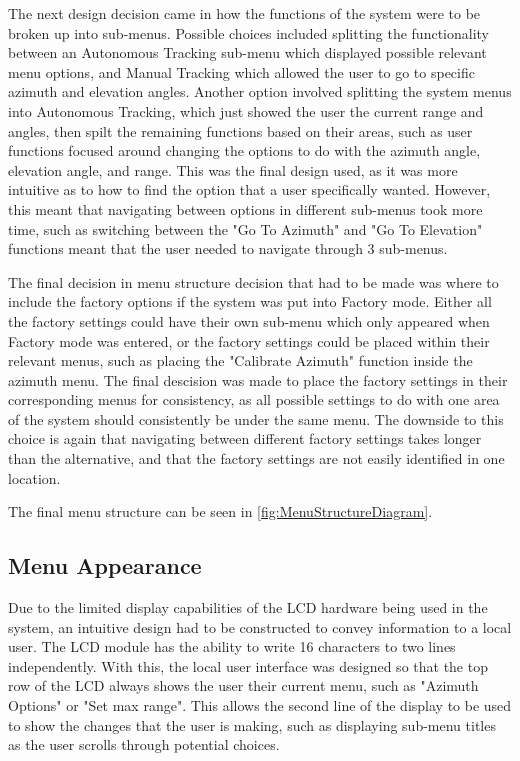 \documentclass[]{report}
\begin{document}
The next design decision came in how the functions of the system were to be broken up into sub-menus. Possible choices included splitting the functionality between an Autonomous Tracking sub-menu which displayed possible relevant menu options, and Manual Tracking which allowed the user to go to specific azimuth and elevation angles. Another option involved splitting the system menus into Autonomous Tracking, which just showed the user the current range and angles, then spilt the remaining functions based on their areas, such as user functions focused around changing the options to do with the azimuth angle, elevation angle, and range. This was the final design used, as it was more intuitive as to how to find the option that a user specifically wanted. However, this meant that navigating between options in different sub-menus took more time, such as switching between the "Go To Azimuth" and "Go To Elevation" functions meant that the user needed to navigate through 3 sub-menus.


The final decision in menu structure decision that had to be made was where to include the factory options if the system was put into Factory mode. Either all the factory settings could have their own sub-menu which only appeared when Factory mode was entered, or the factory settings could be placed within their relevant menus, such as placing the "Calibrate Azimuth" function inside the azimuth menu. The final descision was made to place the factory settings in their corresponding menus for consistency, as all possible settings to do with one area of the system should consistently be under the same menu. The downside to this choice is again that navigating between different factory settings takes longer than the alternative, and that the factory settings are not easily identified in one location. 


The final menu structure can be seen in \ref{fig:MenuStructureDiagram}.

\subsection{Menu Appearance}
Due to the limited display capabilities of the LCD hardware being used in the system, an intuitive design had to be constructed to convey information to a local user. The LCD module has the ability to write 16 characters to two lines independently. With this, the local user interface was designed so that the top row of the LCD always shows the user their current menu, such as "Azimuth Options" or "Set max range". This allows the second line of the display to be used to show the changes that the user is making, such as displaying sub-menu titles as the user scrolls through potential choices. 
\end{document}

